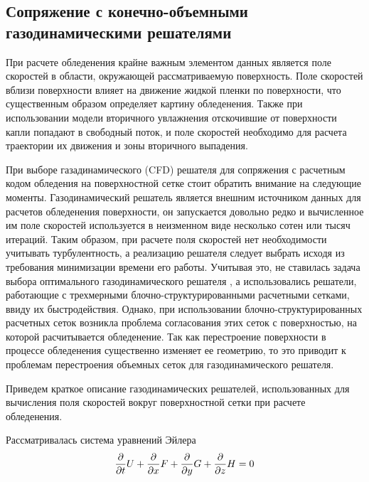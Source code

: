 \subsection{Сопряжение с конечно-объемными газодинамическими решателями}\label{sec:text_1_gas}

При расчете обледенения крайне важным элементом данных является поле скоростей в области, окружающей рассматриваемую поверхность.
Поле скоростей вблизи поверхности влияет на движение жидкой пленки по поверхности, что существенным образом определяет картину обледенения.
Также при использовании модели вторичного увлажнения отскочившие от поверхности капли попадают в свободный поток, и поле скоростей необходимо для расчета траектории их движения и зоны вторичного выпадения.

При выборе газадинамического (CFD\label{abbr:cfd}) решателя для сопряжения с расчетным кодом обледения на поверхностной сетке стоит обратить внимание на следующие моменты.
Газодинамический решатель является внешним источником данных для расчетов обледенения поверхности, он запускается довольно редко и вычисленное им поле скоростей используется в неизменном виде несколько сотен или тысяч итераций.
Таким образом, при расчете поля скоростей нет необходимости учитывать турбулентность, а реализацию решателя следует выбрать исходя из требования минимизации времени его работы.
Учитывая это, не ставилась задача выбора оптимального газодинамического решателя \cite{Blazek2015CFD}, а использовались решатели, работающие с трехмерными блочно-структурированными расчетными сетками, ввиду их быстродействия.
Однако, при использовании блочно-структурированных расчетных сеток возникла проблема согласования этих сеток с поверхностью, на которой расчитывается обледенение.
Так как перестроение поверхности в процессе обледенения существенно изменяет ее геометрию, то это приводит к проблемам перестроения объемных сеток для газодинамического решателя.

Приведем краткое описание газодинамических решателей, использованных для вычисления поля скоростей вокруг поверхностной сетки при расчете обледенения.

Рассматривалась система уравнений Эйлера \cite{Kulikovsky2001Gas}
\begin{equation}\label{eqn:text_1_gas_system}
	\frac{\partial}{\partial t} U + \frac{\partial}{\partial x} F + \frac{\partial}{\partial y} G + \frac{\partial}{\partial z} H = 0 \\
\end{equation}

